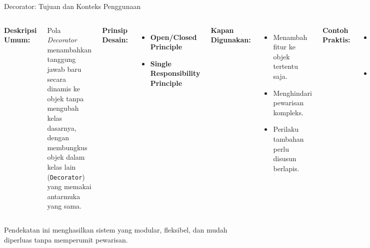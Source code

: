 \documentclass[aspectratio=169, table]{beamer}
\begin{document}
\begin{frame}[fragile]{Decorator: Tujuan dan Konteks Penggunaan}
	\vspace{20pt}
	\begin{columns}[t]
		\textbf{Deskripsi Umum:}
		
		Pola \textit{Decorator} menambahkan tanggung jawab baru secara dinamis ke objek tanpa mengubah kelas dasarnya, dengan membungkus objek dalam kelas lain (\texttt{Decorator}) yang memakai antarmuka yang sama.
		
		\vspace{6pt}
		\textbf{Prinsip Desain:}
		\begin{itemize}
			\item \textbf{Open/Closed Principle}
			\item \textbf{Single Responsibility Principle}
		\end{itemize}
		
		\textbf{Kapan Digunakan:}
		\begin{itemize}
			\item Menambah fitur ke objek tertentu saja.
			\item Menghindari pewarisan kompleks.
			\item Perilaku tambahan perlu disusun berlapis.
		\end{itemize}
		
		\vspace{4pt}
		\textbf{Contoh Praktis:}
		\begin{itemize}
			\item GUI: Tombol dengan border, shadow, tooltip.
			\item Java I/O: \texttt{BufferedReader}, \texttt{InputStreamReader}.
		\end{itemize}
	\end{columns}
\vspace{5pt}
	Pendekatan ini menghasilkan sistem yang modular, fleksibel, dan mudah diperluas tanpa memperumit pewarisan.
\end{frame}
\end{document}
